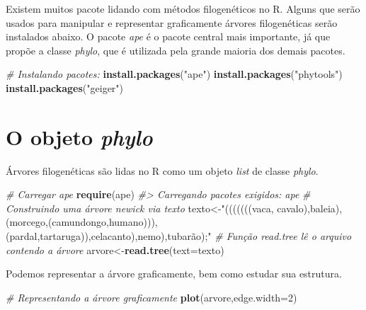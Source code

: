 \documentclass[
]{book}
\newenvironment{Shaded}{\begin{snugshade}}{\end{snugshade}}
\newcommand{\AttributeTok}[1]{\textcolor[rgb]{0.13,0.29,0.53}{#1}}
\newcommand{\CommentTok}[1]{\textcolor[rgb]{0.56,0.35,0.01}{\textit{#1}}}
\newcommand{\DecValTok}[1]{\textcolor[rgb]{0.00,0.00,0.81}{#1}}
\newcommand{\FunctionTok}[1]{\textcolor[rgb]{0.13,0.29,0.53}{\textbf{#1}}}
\newcommand{\NormalTok}[1]{#1}
\newcommand{\OtherTok}[1]{\textcolor[rgb]{0.56,0.35,0.01}{#1}}
\newcommand{\StringTok}[1]{\textcolor[rgb]{0.31,0.60,0.02}{#1}}
\begin{document}
Existem muitos pacote lidando com métodos filogenéticos no R.
Alguns que serão usados para manipular e representar graficamente árvores filogenéticas serão instalados abaixo.
O pacote \emph{ape} é o pacote central mais importante, já que propõe a classe \emph{phylo}, que é utilizada pela grande maioria dos demais pacotes.

\begin{Shaded}
\begin{Highlighting}[]
\CommentTok{\# Instalando pacotes: }
\FunctionTok{install.packages}\NormalTok{(}\StringTok{"ape"}\NormalTok{) }
\FunctionTok{install.packages}\NormalTok{(}\StringTok{"phytools"}\NormalTok{) }
\FunctionTok{install.packages}\NormalTok{(}\StringTok{"geiger"}\NormalTok{)}
\end{Highlighting}
\end{Shaded}

\section{\texorpdfstring{O objeto \emph{phylo}}{O objeto phylo}}\label{o-objeto-phylo}

Árvores filogenéticas são lidas no R como um objeto \emph{list} de classe \emph{phylo}.

\begin{Shaded}
\begin{Highlighting}[]
\CommentTok{\# Carregar ape }
\FunctionTok{require}\NormalTok{(ape) }
\CommentTok{\#\textgreater{} Carregando pacotes exigidos: ape}
\CommentTok{\# Construindo uma árvore newick via texto }
\NormalTok{texto}\OtherTok{\textless{}{-}}\StringTok{"(((((((vaca, cavalo),baleia),(morcego,(camundongo,humano))),(pardal,tartaruga)),celacanto),nemo),tubarão);"}
\CommentTok{\# Função read.tree lê o arquivo contendo a árvore }
\NormalTok{arvore}\OtherTok{\textless{}{-}}\FunctionTok{read.tree}\NormalTok{(}\AttributeTok{text=}\NormalTok{texto)}
\end{Highlighting}
\end{Shaded}

Podemos representar a árvore graficamente, bem como estudar sua estrutura.

\begin{Shaded}
\begin{Highlighting}[]
\CommentTok{\# Representando a árvore graficamente }
\FunctionTok{plot}\NormalTok{(arvore,}\AttributeTok{edge.width=}\DecValTok{2}\NormalTok{) }
\end{Highlighting}
\end{Shaded}
\end{document}
